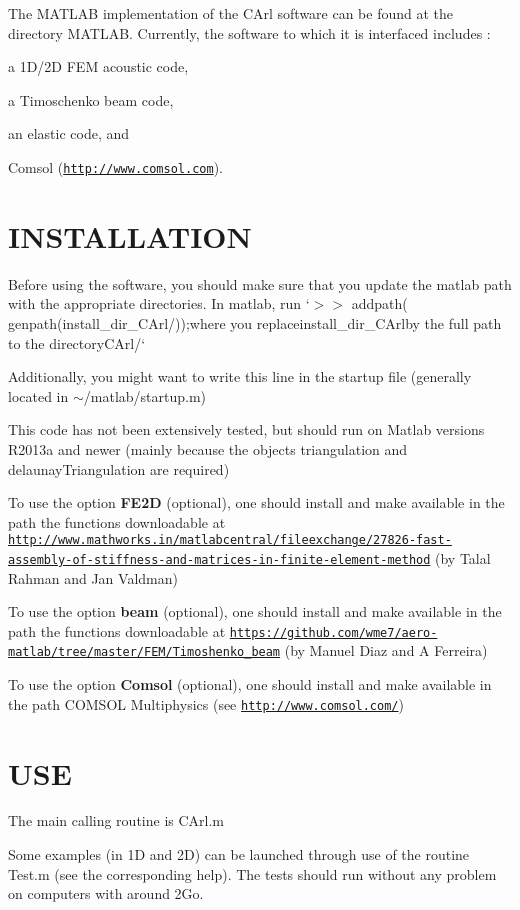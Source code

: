 The M\+A\+T\+L\+A\+B implementation of the C\+Arl software can be found at the directory {\ttfamily M\+A\+T\+L\+A\+B}. Currently, the software to which it is interfaced includes \+:


\begin{DoxyEnumerate}
\item a 1\+D/2\+D F\+E\+M acoustic code,
\item a Timoschenko beam code,
\item an elastic code, and
\item Comsol (\href{http://www.comsol.com}{\tt http\+://www.\+comsol.\+com}).
\end{DoxyEnumerate}

\section*{I\+N\+S\+T\+A\+L\+L\+A\+T\+I\+O\+N}

Before using the software, you should make sure that you update the matlab path with the appropriate directories. In matlab, run `$>$$>$ addpath( genpath(\textquotesingle{}install\+\_\+dir\+\_\+\+C\+Arl/\textquotesingle{}));{\ttfamily  where you replace}install\+\_\+dir\+\_\+\+C\+Arl{\ttfamily by the full path to the directory}C\+Arl/`

Additionally, you might want to write this line in the startup file (generally located in {\ttfamily $\sim$/matlab/startup.m})

This code has not been extensively tested, but should run on Matlab versions R2013a and newer (mainly because the objects triangulation and delaunay\+Triangulation are required)

To use the option {\bfseries F\+E2\+D} (optional), one should install and make available in the path the functions downloadable at \href{http://www.mathworks.in/matlabcentral/fileexchange/27826-fast-assembly-of-stiffness-and-matrices-in-finite-element-method}{\tt http\+://www.\+mathworks.\+in/matlabcentral/fileexchange/27826-\/fast-\/assembly-\/of-\/stiffness-\/and-\/matrices-\/in-\/finite-\/element-\/method} (by Talal Rahman and Jan Valdman)

To use the option {\bfseries beam} (optional), one should install and make available in the path the functions downloadable at \href{https://github.com/wme7/aero-matlab/tree/master/FEM/Timoshenko_beam}{\tt https\+://github.\+com/wme7/aero-\/matlab/tree/master/\+F\+E\+M/\+Timoshenko\+\_\+beam} (by Manuel Diaz and A Ferreira)

To use the option {\bfseries Comsol} (optional), one should install and make available in the path C\+O\+M\+S\+O\+L Multiphysics (see \href{http://www.comsol.com/}{\tt http\+://www.\+comsol.\+com/})

\section*{U\+S\+E}

The main calling routine is {\ttfamily C\+Arl.\+m}

Some examples (in 1\+D and 2\+D) can be launched through use of the routine {\ttfamily Test.\+m} (see the corresponding help). The tests should run without any problem on computers with around 2\+Go. 